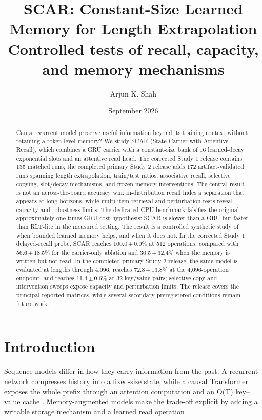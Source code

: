 \documentclass{article}
\title{SCAR: Constant-Size Learned Memory for Length Extrapolation\\
\large Controlled tests of recall, capacity, and memory mechanisms}
\author{Arjun K. Shah}
\date{September 2026}
\begin{document}
\maketitle

\begin{abstract}
Can a recurrent model preserve useful information beyond its training context
without retaining a token-level memory? We study SCAR (State-Carrier with
Attentive Recall), which combines a GRU carrier with a constant-size bank of
16 learned-decay exponential slots and an attentive read head. The
corrected Study 1 release contains 135 matched runs; the completed
primary Study 2 release adds 172 artifact-validated runs spanning
length extrapolation, train/test ratios, associative recall, selective copying,
slot/decay mechanisms, and frozen-memory interventions. The central result is
not an across-the-board accuracy win: in-distribution recall hides a separation
that appears at long horizons, while multi-item retrieval and perturbation
tests reveal capacity and robustness limits. The dedicated CPU benchmark
falsifies the original approximately one-times-GRU cost hypothesis: SCAR is
slower than a GRU but faster than RLT-lite in the measured setting. The result
is a controlled synthetic study of when bounded learned memory helps, and when
it does not.
In the corrected Study 1 delayed-recall probe, SCAR reaches 100.0\,$\pm$\,0.0\% at 512 operations, compared with 56.6\,$\pm$\,18.5\% for the carrier-only ablation and 30.5\,$\pm$\,32.4\% when the memory is written but not read. In the completed primary Study 2 release, the same model is evaluated at lengths through 4,096, reaches 72.8\,$\pm$\,13.8\% at the 4,096-operation endpoint, and reaches 11.4\,$\pm$\,0.6\% at 32 key/value pairs; selective-copy and intervention sweeps expose capacity and perturbation limits. The release covers the principal reported matrices, while several secondary preregistered conditions remain future work.
\end{abstract}

\section{Introduction}
Sequence models differ in how they carry information from the past. A
recurrent network compresses history into a fixed-size state, while a causal
Transformer exposes the whole prefix through an attention computation and an
O(T) key--value cache \cite{elman1990,hochreiter1997,cho2014,vaswani2017}.
Memory-augmented models make the trade-off explicit by adding a writable
storage mechanism and a learned read operation \cite{sukhbaatar2015}.
\end{document}
